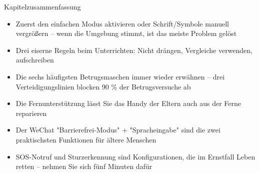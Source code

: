 \begin{tcbsummary}{Kapitelzusammenfassung}
\begin{itemize}
  \item Zuerst den einfachen Modus aktivieren oder Schrift/Symbole manuell vergrößern – wenn die Umgebung stimmt, ist das meiste Problem gelöst
  \item Drei eiserne Regeln beim Unterrichten: Nicht drängen, Vergleiche verwenden, aufschreiben
  \item Die sechs häufigsten Betrugsmaschen immer wieder erwähnen – drei Verteidigungslinien blocken 90 \% der Betrugsversuche ab
  \item Die Fernunterstützung lässt Sie das Handy der Eltern auch aus der Ferne reparieren
  \item Der WeChat "Barrierefrei-Modus" + "Spracheingabe" sind die zwei praktischsten Funktionen für ältere Menschen
  \item SOS-Notruf und Sturzerkennung sind Konfigurationen, die im Ernstfall Leben retten – nehmen Sie sich fünf Minuten dafür
\end{itemize}

\end{tcbsummary}
